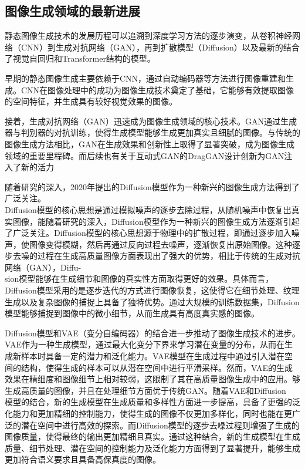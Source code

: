\documentclass[UTF8]{ctexart}
\begin{document}
\subsection{图像生成领域的最新进展}
静态图像生成技术的发展历程可以追溯到深度学习方法的逐步演变，从卷积神经网络（CNN）到生成对抗网络（GAN），再到扩散模型（Diffusion）以及最新的结合了视觉自回归和Transformer结构的模型。\cite{chen_overview_2024}\par
早期的静态图像生成主要依赖于CNN，通过自动编码器等方法进行图像重建和生成。CNN在图像处理中的成功为图像生成技术奠定了基础，它能够有效提取图像的空间特征，并生成具有较好视觉效果的图像。\par
接着，生成对抗网络（GAN）迅速成为图像生成领域的核心技术。\cite{goodfellow_generative_2014}GAN通过生成器与判别器的对抗训练，使得生成模型能够生成更加真实且细腻的图像。与传统的图像生成方法相比，GAN在生成效果和创新性上取得了显著突破，成为图像生成领域的重要里程碑。而后续也有关于互动式GAN的DragGAN\cite{pan_drag_2023}设计创新为GAN注入了新的活力\par
随着研究的深入，2020年提出的Diffusion模型作为一种新兴的图像生成方法得到了广泛关注。\cite{ho_denoising_2020}\\Diffusion模型的核心思想是通过模拟噪声的逐步去除过程，从随机噪声中恢复出真实图像，能随着研究的深入，Diffusion模型作为一种新兴的图像生成方法逐渐引起了广泛关注。Diffusion模型的核心思想源于物理中的扩散过程，即通过逐步加入噪声，使图像变得模糊，然后再通过反向过程去噪声，逐渐恢复出原始图像。这种逐步去噪的过程在生成高质量图像方面表现出了强大的优势，相比于传统的生成对抗网络（GAN），Diffu-\\sion模型能够在生成细节和图像的真实性方面取得更好的效果。具体而言，Diffusion模型采用的是逐步迭代的方式进行图像恢复，这使得它在细节处理、纹理生成以及复杂图像的捕捉上具备了独特优势。通过大规模的训练数据集，Diffusion模型能够捕捉到图像中的微小细节，从而生成具有高度真实感的图像。\par
Diffusion模型和VAE（变分自编码器）的结合进一步推动了图像生成技术的进步。VAE作为一种生成模型，通过最大化变分下界来学习潜在变量的分布，从而在生成新样本时具备一定的潜力和泛化能力。VAE模型在生成过程中通过引入潜在空间的结构，使得生成的样本可以从潜在空间中进行平滑采样。然而，VAE的生成效果在精细度和图像细节上相对较弱，这限制了其在高质量图像生成中的应用。够生成高质量的图像，并且在处理细节方面优于传统GAN。随着VAE和Diffusion\\模型的结合，新的生成模型在生成质量和多样性方面进一步提高，具备了更强的泛化能力和更加精细的控制能力，使得生成的图像不仅更加多样化，同时也能在更广泛的潜在空间中进行高效的探索。而Diffusion模型的逐步去噪过程则增强了生成的图像质量，使得最终的输出更加精细且真实。通过这种结合，新的生成模型在生成质量、细节处理、潜在空间的控制能力及泛化能力方面得到了显著提升，能够生成更加符合语义要求且具备高保真度的图像。\par
\end{document}
